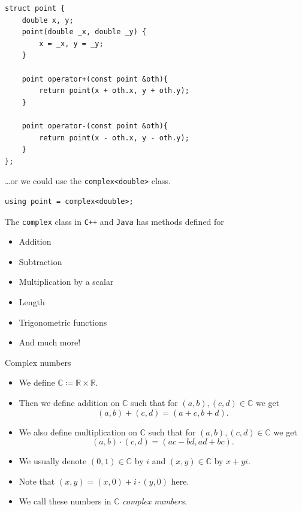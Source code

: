 \documentclass{beamer}
\begin{document}
\begin{frame}
  \begin{verbatim}
struct point {
    double x, y;
    point(double _x, double _y) { 
        x = _x, y = _y;
    }

    point operator+(const point &oth){
        return point(x + oth.x, y + oth.y);
    }

    point operator-(const point &oth){
        return point(x - oth.x, y - oth.y);
    }
};
  \end{verbatim}
\end{frame}

\begin{frame}
  \vspace{20pt}
  \ldots or we could use the \texttt{complex<double>} class. 
  \begin{verbatim}
using point = complex<double>;
  \end{verbatim}
  \vspace{10pt}
  The \texttt{complex} class in \texttt{C++} and \texttt{Java} has methods defined for
  \begin{itemize}
    \item Addition
    \item Subtraction
    \item Multiplication by a scalar
    \item Length
    \item Trigonometric functions
    \item And much more!
  \end{itemize}
\end{frame}

\begin{frame}[plain]{Complex numbers}
	\begin{itemize}
        \item We define $\mathbb{C} \coloneqq \mathbb{R} \times \mathbb{R}$.
        \item Then we define addition on $\mathbb{C}$ such that for $(a, b), (c, d) \in \mathbb{C}$ we get
			\[
				(a, b) + (c, d) = (a + c, b + d).
			\]
        \item We also define multiplication on $\mathbb{C}$ such that for $(a, b), (c, d) \in \mathbb{C}$ we get
			\[
				(a, b) \cdot (c, d) = (ac - bd, ad + bc).
			\]
        \item We usually denote $(0, 1) \in \mathbb{C}$ by $i$ and $(x, y) \in \mathbb{C}$ by $x + yi$.
        \item Note that $(x, y) = (x, 0) + i \cdot (y, 0)$ here.
        \item We call these numbers in $\mathbb{C}$ \emph{complex numbers}.
    \end{itemize}
\end{frame}
\end{document}

